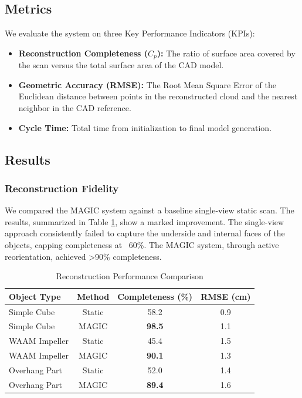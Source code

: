 \documentclass[letterpaper, 10 pt, conference]{ieeeconf}  %
\begin{document}
\subsection{Metrics}
We evaluate the system on three Key Performance Indicators (KPIs):
\begin{itemize}
    \item \textbf{Reconstruction Completeness ($C_p$):} The ratio of surface area covered by the scan versus the total surface area of the CAD model.
    \item \textbf{Geometric Accuracy (RMSE):} The Root Mean Square Error of the Euclidean distance between points in the reconstructed cloud and the nearest neighbor in the CAD reference.
    \item \textbf{Cycle Time:} Total time from initialization to final model generation.
\end{itemize}

\subsection{Results}

\subsubsection{Reconstruction Fidelity}
We compared the MAGIC system against a baseline single-view static scan. The results, summarized in Table \ref{table_results}, show a marked improvement. The single-view approach consistently failed to capture the underside and internal faces of the objects, capping completeness at ~60\%. The MAGIC system, through active reorientation, achieved >90\% completeness.

\begin{table}[h]
\caption{Reconstruction Performance Comparison}
\label{table_results}
\begin{center}
\begin{tabular}{|l||c|c|c|}
\hline
Object Type & Method & Completeness (\%) & RMSE (cm) \\
\hline
Simple Cube & Static & 58.2 & 0.9 \\
Simple Cube & MAGIC & \textbf{98.5} & 1.1 \\
\hline
WAAM Impeller & Static & 45.4 & 1.5 \\
WAAM Impeller & MAGIC & \textbf{90.1} & 1.3 \\
\hline
Overhang Part & Static & 52.0 & 1.4 \\
Overhang Part & MAGIC & \textbf{89.4} & 1.6 \\
\hline
\end{tabular}
\end{center}
\end{table}
\end{document}

